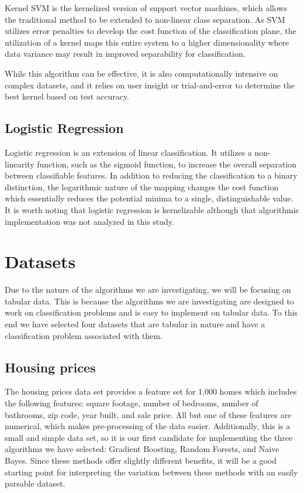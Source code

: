 \documentclass[10pt,twocolumn,letterpaper]{article}
\begin{document}
Kernel SVM is the kernelized version of support vector machines, which allows the traditional method to be extended to non-linear class separation.
As SVM utilizes error penalties to develop the cost function of the classification plane, the utilization of a kernel maps this entire system to a higher dimensionality where data variance may result in improved separability for classification.

While this algorithm can be effective, it is also computationally intensive on complex datasets, and it relies on user insight or trial-and-error to determine the best kernel based on test accuracy. 


\subsection{Logistic Regression}

Logistic regression is an extension of linear classification. It utilizes a non-linearity function, such as the sigmoid function, to increase the overall separation between classifiable features.
In addition to reducing the classification to a binary distinction, the logarithmic nature of the mapping changes the cost function which essentially reduces the potential minima to a single, distinguishable value.
It is worth noting that logistic regression is kernelizable although that algorithmic implementation was not analyzed in this study.


\section{Datasets}

Due to the nature of the algorithms we are investigating, we will be focusing on tabular data.
This is because the algorithms we are investigating are designed to work on classification problems and is easy to implement on tabular data.
To this end we have selected four datasets that are tabular in nature and have a classification problem associated with them.

\subsection{Housing prices \cite{ds1}}

The housing prices data set provides a feature set for 1,000 homes which includes the following features: square footage, number of bedrooms, number of bathrooms, zip code, year built, and sale price.
All but one of these features are numerical, which makes pre-processing of the data easier.
Additionally, this is a small and simple data set, so it is our first candidate for implementing the three algorithms we have selected: Gradient Boosting, Random Forests, and Naive Bayes.
Since these methods offer slightly different benefits, it will be a good starting point for interpreting the variation between these methods with an easily parsable dataset.
\end{document}
